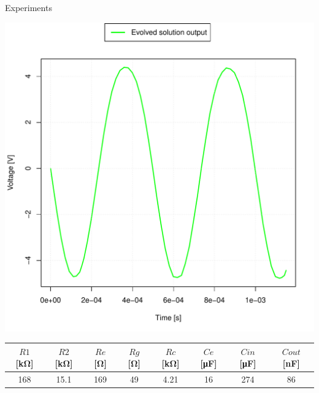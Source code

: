 \documentclass[10pt,xcolor=pdflatex]{beamer}
\begin{document}
\begin{frame}{Experiments}

\centering
{\includegraphics[scale=0.35]{best-solution-single-stage}}

\begin{table}[H]
\begin{adjustbox}{max width=\textwidth}
\begin{tabular}{@{}cccccccc@{}}
\toprule
    $R1$ [\si{\kilo\ohm}] & $R2$ [\si{\kilo\ohm}] & $Re$ [\si{\ohm}] & $Rg$ [\si{\ohm}] & $Rc$ [\si{\kilo\ohm}] & $Ce$ [\si{\micro\farad}] & $Cin$ [\si{\micro\farad}] & $Cout$ [\si{\nano\farad}] \\
    \midrule
    168 & 15.1 & 169 & 49 & 4.21 & 16 & 274 & 86 \\
    \bottomrule
\end{tabular}
\end{adjustbox}
\end{table}
\end{frame}
\end{document}
